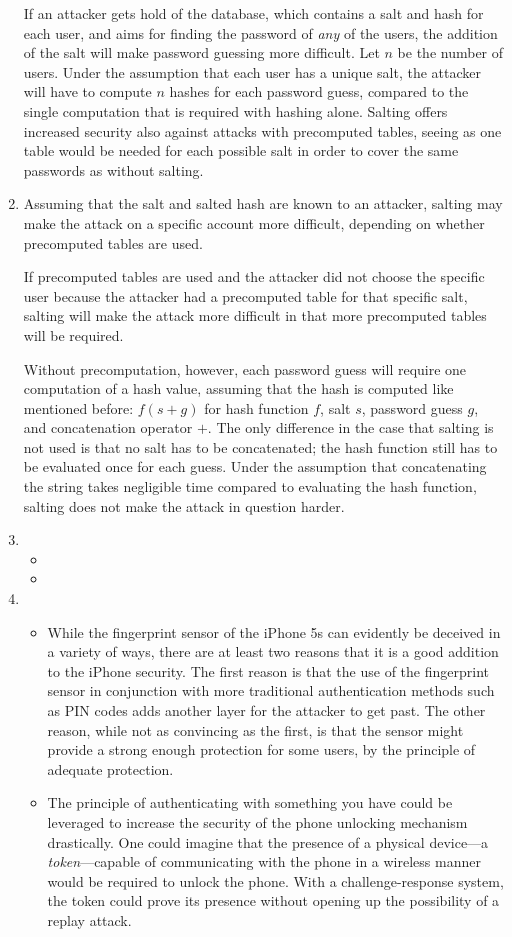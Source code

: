 \begin{enumerate}
If an attacker gets hold of the database, which contains a salt and hash for each user, and aims for finding the password of \emph{any} of the users, the addition of the salt will make password guessing more difficult. Let $n$ be the number of users. Under the assumption that each user has a unique salt, the attacker will have to compute $n$ hashes for each password guess, compared to the single computation that is required with hashing alone\cite{book:salting}. Salting offers increased security also against attacks with precomputed tables, seeing as one table would be needed for each possible salt in order to cover the same passwords as without salting.
\item %
Assuming that the salt and salted hash are known to an attacker, salting may make the attack on a specific account more difficult, depending on whether precomputed tables are used.

If precomputed tables are used and the attacker did not choose the specific user because the attacker had a precomputed table for that specific salt, salting will make the attack more difficult in that more precomputed tables will be required.

Without precomputation, however, each password guess will require one computation of a hash value, assuming that the hash is computed like mentioned before: $f(s + g)$ for hash function $f$, salt $s$, password guess $g$, and concatenation operator $+$. The only difference in the case that salting is not used is that no salt has to be concatenated; the hash function still has to be evaluated once for each guess. Under the assumption that concatenating the string takes negligible time compared to evaluating the hash function, salting does not make the attack in question harder.
\item \highergradesonly
  \begin{itemize}
    \item
    \item
  \end{itemize}
\item %
  \begin{itemize}
    \item
      While the fingerprint sensor of the iPhone 5s can evidently be deceived in a variety of ways, there are at least two reasons that it is a good addition to the iPhone security. The first reason is that the use of the fingerprint sensor in conjunction with more traditional authentication methods such as PIN codes adds another layer for the attacker to get past. The other reason, while not as convincing as the first, is that the sensor might provide a strong enough protection for some users, by the principle of adequate protection.
    \item
      The principle of authenticating with something you have could be leveraged to increase the security of the phone unlocking mechanism drastically. One could imagine that the presence of a physical device---a \textit{token}---capable of communicating with the phone in a wireless manner would be required to unlock the phone. With a challenge-response system, the token could prove its presence without opening up the possibility of a replay attack.


\end{itemize}
\end{enumerate}
